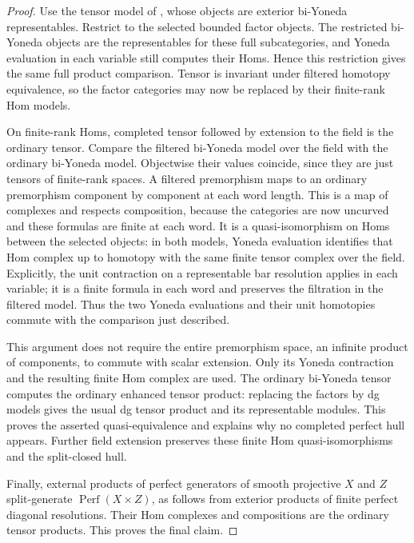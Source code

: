 \documentclass[11pt]{article}
\numberwithin{equation}{section}
\theoremstyle{definition}
\theoremstyle{remark}
\begin{document}
\begin{proof}
Use the tensor model of \cite[Section~16.1]{Floer:Fukaya},
whose objects are exterior bi-Yoneda representables.  Restrict
to the selected bounded factor objects.  The restricted
bi-Yoneda objects are the representables for these full
subcategories, and Yoneda evaluation in each variable still
computes their Homs.  Hence this restriction gives the same
full product comparison.  Tensor is invariant under filtered
homotopy equivalence, so the factor categories may now be
replaced by their finite-rank Hom models.

On finite-rank Homs, completed tensor followed by extension
to the field is the ordinary tensor.  Compare the filtered
bi-Yoneda model over the field with the ordinary bi-Yoneda
model.  Objectwise their values coincide, since they are
just tensors of finite-rank spaces.  A filtered premorphism
maps to an ordinary premorphism component by component at
each word length.  This is a map of complexes and respects
composition, because the categories are now uncurved and
these formulas are finite at each word.  It is a
quasi-isomorphism on Homs between the selected objects:
in both models, Yoneda evaluation identifies that Hom
complex up to homotopy with the same finite tensor complex
over the field.  Explicitly, the unit contraction on a
representable bar resolution applies in each variable;
it is a finite formula in each word and preserves the
filtration in the filtered model.  Thus the two Yoneda
evaluations and their unit homotopies commute with the
comparison just described.

This argument does not require the entire premorphism space,
an infinite product of components, to commute with scalar
extension.  Only its Yoneda contraction and the resulting
finite Hom complex are used.  The ordinary bi-Yoneda tensor
computes the ordinary enhanced tensor product: replacing
the factors by dg models gives the usual dg tensor product
and its representable modules.  This proves the asserted
quasi-equivalence and explains why no completed perfect
hull appears.  Further field extension preserves these
finite Hom quasi-isomorphisms and the split-closed hull.

Finally, external products of perfect generators of smooth
projective $X$ and $Z$ split-generate $\operatorname{Perf}(X\times Z)$,
as follows from exterior products of finite perfect
diagonal resolutions.  Their Hom complexes and compositions
are the ordinary tensor products.  This proves the final
claim.
\end{proof}
\end{document}
